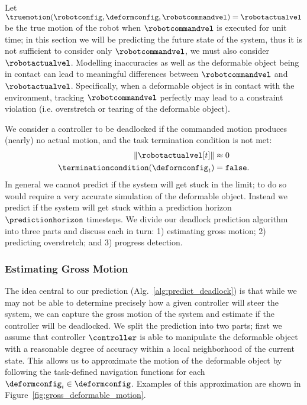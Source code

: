 Let $\truemotion(\robotconfig, \deformconfig, \robotcommandvel) = \robotactualvel$ be the true motion of the robot when $\robotcommandvel$ is executed for unit time; in this section we will be predicting the future state of the system, thus it is not sufficient to consider only $\robotcommandvel$, we must also consider $\robotactualvel$.  Modelling inaccuracies as well as the deformable object being in contact can lead to meaningful differences between $\robotcommandvel$ and $\robotactualvel$. Specifically, when a deformable object is in contact with the environment, tracking $\robotcommandvel$ perfectly may lead to a constraint violation (i.e. overstretch or tearing of the deformable object).

We consider a controller to be deadlocked if the commanded motion produces (nearly) no actual motion, and the task termination condition is not met:
\begin{equation}
    \begin{split}
        \| \robotactualvel[t] \|               &\approx 0 \\
        \terminationcondition(\deformconfig_t) &= \texttt{false}.
        \label{eqn:stuck}
    \end{split}
\end{equation}
In general we cannot predict if the system will get stuck in the limit; to do so would require a very accurate simulation of the deformable object. Instead we predict if the system will get stuck within a prediction horizon $\predictionhorizon$ timesteps. We divide our deadlock prediction algorithm into three parts and discuss each in turn: 1) estimating gross motion; 2) predicting overstretch; and 3) progress detection.



\subsubsection{Estimating Gross Motion}

The idea central to our prediction (Alg.~\ref{alg:predict_deadlock}) is that while we may not be able to determine precisely how a given controller will steer the system, we can capture the gross motion of the system and estimate if the controller will be deadlocked. We split the prediction into two parts; first we assume that controller $\controller$ is able to manipulate the deformable object with a reasonable degree of accuracy within a local neighborhood of the current state. This allows us to approximate the motion of the deformable object by following the task-defined navigation functions for each $\deformconfig_i \in \deformconfig$. Examples of this approximation are shown in Figure~\ref{fig:gross_deformable_motion}.

